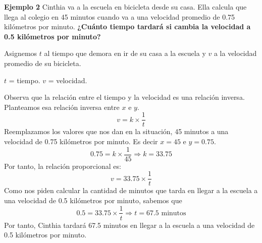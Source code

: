 {\color{brown}\textbf{Ejemplo 2}}
Cinthia va a la escuela en bicicleta desde su casa. Ella calcula que llega al colegio en 45 minutos cuando va a una velocidad promedio de 0.75 kilómetros por minuto.
\textbf{¿Cuánto tiempo tardará si cambia la velocidad a 0.5 kilómetros por minuto?}

Asignemos $t$ al tiempo que demora en ir de su casa a la escuela y $v$ a la velocidad promedio de su bicicleta.
\begin{center}
    $t$ = tiempo. \quad $v$ = velocidad.
\end{center}
Observa que la relación entre el tiempo y la velocidad es una relación inversa. Planteamos esa relación inversa entre $x$ e $y$.
\[v=k \times \frac{1}{t}\]
Reemplazamos los valores que nos dan en la situación, 45 minutos a una velocidad de 0.75 kilómetros por minuto. Es decir $x=45$ e $y=0.75$.
\[0.75=k\times \frac{1}{45} \Rightarrow k=33.75\]
Por tanto, la relación proporcional es:
\[v=33.75 \times \frac{1}{t}\]
Como nos piden calcular la cantidad de minutos que tarda en llegar a la escuela a una velocidad de 0.5 kilómetros por minuto, sabemos que \[0.5=33.75 \times \frac{1}{t} \Rightarrow t=67.5 \text{ minutos}\]
Por tanto, Cinthia tardará 67.5 minutos en llegar a la escuela a una velocidad de 0.5 kilómetros por minuto.\\